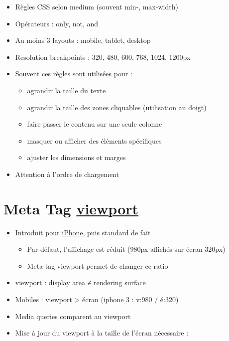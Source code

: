 \begin{itemize}
\tightlist
\item
  Règles CSS selon medium (souvent min-, max-width)
\item
  Opérateurs : only, not, and
\item
  Au moins 3 layouts : mobile, tablet, desktop
\item
  Resolution breakpoints : 320, 480, 600, 768, 1024, 1200px
\item
  Souvent ces règles sont utilisées pour :

  \begin{itemize}
  \tightlist
  \item
    agrandir la taille du texte
  \item
    agrandir la taille des zones cliquables (utilisation au doigt)
  \item
    faire passer le contenu sur une seule colonne
  \item
    masquer ou afficher des éléments spécifiques
  \item
    ajuster les dimensions et marges
  \end{itemize}
\item
  Attention à l'ordre de chargement
\end{itemize}

\hypertarget{meta-tag-viewport8}{%
\section{\texorpdfstring{Meta Tag
\href{http://blog.javierusobiaga.com/stop-using-the-viewport-tag-until-you-know-ho}{viewport}}{Meta Tag viewport}}\label{meta-tag-viewport8}}

\begin{itemize}
\tightlist
\item
  Introduit pour
  \href{https://developer.apple.com/library/content/documentation/AppleApplications/Reference/SafariWebContent/UsingtheViewport/UsingtheViewport.html}{iPhone},
  puis standard de fait

  \begin{itemize}
  \tightlist
  \item
    Par défaut, l'affichage est réduit (980px affichés sur écran 320px)
  \item
    Meta tag viewport permet de changer ce ratio
  \end{itemize}
\item
  viewport : display area ≠ rendering surface
\item
  Mobiles : viewport \textgreater{} écran (iphone 3 : v:980 / é:320)
\item
  Media queries comparent au viewport
\item
  Mise à jour du viewport à la taille de l'écran nécessaire :
\end{itemize}

